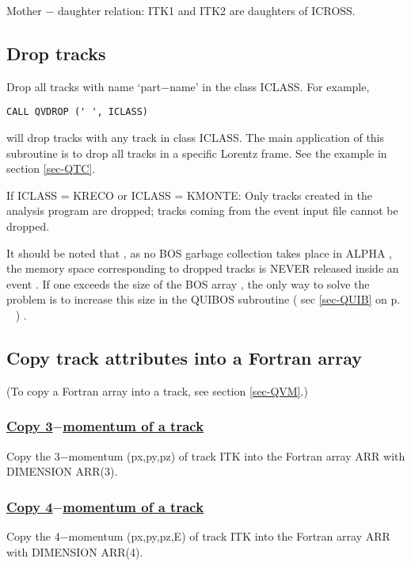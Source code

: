 Mother $-$ daughter relation: ITK1 and ITK2 are daughters of ICROSS.
 
\subsection{\label{sec-QVD}Drop tracks}
\par
{}
\par
\par
Drop all tracks with name `part$-$name' in the class ICLASS.
For example,
\begin{verbatim}
CALL QVDROP (' ', ICLASS)
\end{verbatim}
will drop tracks with any track in class
ICLASS.
The main application of this subroutine is to
drop all tracks in a specific Lorentz frame.
See the example in section \ref{sec-QTC}.
\par If ICLASS = KRECO or ICLASS = KMONTE:
Only tracks created in the analysis program are dropped; tracks coming
from the event input file cannot be dropped.
\par
It should be noted that , as no BOS garbage
collection takes place in ALPHA , the memory space corresponding to dropped tracks is NEVER released inside an event .
If one exceeds the size of the BOS array , the only way to solve the problem is to increase this size in the
QUIBOS subroutine ( sec \ref{sec-QUIB}  on p. ~\pageref{sec-QUIB} ) .
\par
\subsection{\label{sec-QVG}Copy track attributes into a Fortran array}
\par
(To copy a Fortran array into a track, see section
\ref{sec-QVM}.)
 
\subsubsection{\underline{Copy 3$-$momentum of a track}}
\par
{}
\par
\par
Copy the 3$-$momentum (px,py,pz) of track ITK into the Fortran array
ARR with DIMENSION ARR(3).
\par
\subsubsection{\underline{Copy 4$-$momentum of a track}}
\par
{}
\par
\par
Copy the 4$-$momentum (px,py,pz,E) of track ITK into the Fortran
array ARR with DIMENSION ARR(4).
 
